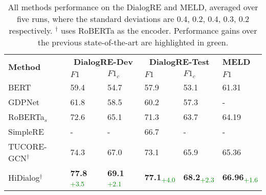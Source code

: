 \begin{table}[t]

  \begin{center}

  \setlength{\tabcolsep}{6pt}
  \begin{tabular}{llllll}
    \toprule
  \multirow{2}{*}{\textbf{Method}} &\multicolumn{2}{c}{\textbf{DialogRE-Dev}}  &\multicolumn{2}{c}{\textbf{DialogRE-Test}}  &  \textbf{MELD} \\
    \cmidrule(l){2-3}   \cmidrule(l){4-5}     \cmidrule(l){6-6} 
      & $F1$ & $F1_c$ & $F1$ & $F1_c$  & $F1$\\
    \midrule
    BERT   & 59.4 & 54.7 & 57.9 & 53.1 & 61.31\\ 
    GDPNet & 61.8 & 58.5 & 60.2 & 57.3 & - \\
    RoBERTa$_s$ & 72.6 & 65.1 & 71.3 & 63.7 & 64.19\\
    SimpleRE & - & -  & 66.7  & - & - \\ 
    TUCORE-GCN$^\dag$ & 74.3 & 67.0 & 73.1 & 65.9 & 65.36\\
    \midrule
    HiDialog$^\dag$ & 
    \textbf{77.8} \textsubscript{\textcolor{green}{+3.5}}& 
    \textbf{69.1} \textsubscript{\textcolor{green}{+2.1}} &
    \textbf{77.1}\textsubscript{\textcolor{green}{+4.0}} & \textbf{68.2}\textsubscript{\textcolor{green}{+2.3}} & \textbf{66.96}\textsubscript{\textcolor{green}{+1.6}}\\
    \bottomrule
  \end{tabular}
  \end{center}
  \caption{All methods performance on the DialogRE and MELD, averaged over five runs, where the standard deviations are 0.4, 0.2, 0.4, 0.3, 0.2 respectively. $^\dag$ uses RoBERTa as the encoder. Performance gains over the previous state-of-the-art are highlighted in green. }
  \label{tab:exp-re}
\end{table}



